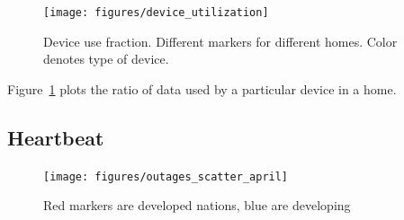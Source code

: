 \begin{figure}[t]
  \texttt{[image: figures/device\_utilization]}
  \caption{Device use fraction. Different markers for different homes. Color denotes type of device.}
  \label{fig:dev-util}
\end{figure}

Figure~\ref{fig:dev-util} plots the ratio of data used by a particular device in a home.

\subsection{Heartbeat}

\begin{figure}[t]
  \texttt{[image: figures/outages\_scatter\_april]}
  \caption{Red markers are developed nations, blue are developing}
  \label{fig:outage-scatter}
\end{figure}
